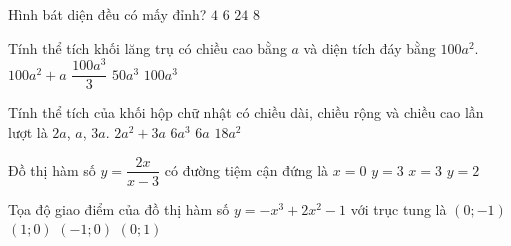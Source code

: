 \begin{ex}%
Hình bát diện đều có mấy đỉnh?
\choice
{$4$}
{\True $6$}
{$24$}
{$8$}
\end{ex}
\begin{ex}%
Tính thể tích khối lăng trụ có chiều cao bằng $a$ và diện tích đáy bằng $100a^2$.
\choice
{$100a^2+a$}
{$\dfrac{100a^3}{3}$}
{$50a^3$}
{\True $100a^3$}
\end{ex}
\begin{ex}%
Tính thể tích của khối hộp chữ nhật có chiều dài, chiều rộng và chiều cao lần lượt là $2a$, $a$, $3a$.
\choice
{$2a^2+3a$}
{\True $6a^3$}
{$6a$}
{$18a^2$}
\end{ex}
\begin{ex}%
Đồ thị hàm số $y=\dfrac{2x}{x-3}$ có đường tiệm cận đứng là
\choice
{$x=0$}
{$y=3$}
{\True $x=3$}
{$y=2$}
\end{ex}
\begin{ex}%
Tọa độ giao điểm của đồ thị hàm số $y=-x^3+2x^2-1$ với trục tung là
\choice
{\True $(0;-1)$}
{$(1;0)$}
{$(-1;0)$}
{$(0;1)$}
\end{ex}
